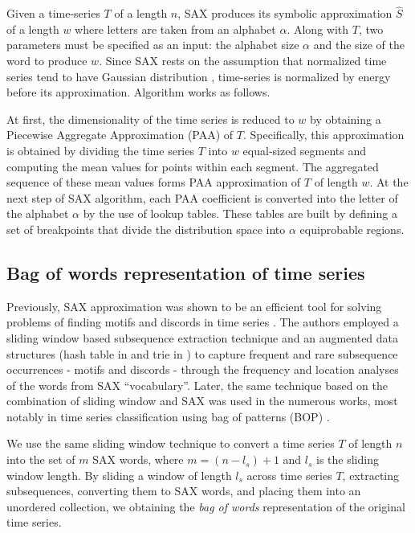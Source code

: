 \documentclass{llncs}
\begin{document}
Given a time-series $T$ of a length $n$, SAX produces its symbolic approximation $\hat{S}$ of 
a length $w$ where letters are taken from an alphabet $\alpha$. 
Along with $T$, two parameters must be specified as an input: the alphabet size $\alpha$ and the 
size of the word to produce $w$. Since SAX rests on the assumption that normalized time series 
tend to have Gaussian distribution \cite{larsen_marx}, time-series is normalized by energy 
\cite{goldin_kanellakis} before its approximation. Algorithm works as follows. 

At first, the dimensionality of the time series is reduced to $w$ by obtaining a 
Piecewise Aggregate Approximation (PAA) of $T$. Specifically, this approximation is 
obtained by dividing the time series $T$ into $w$ equal-sized segments and computing the 
mean values for points within each segment. The aggregated sequence of these mean 
values forms PAA approximation of $T$ of length $w$. At the next step of SAX algorithm, 
each PAA coefficient is converted into the letter of the alphabet $\alpha$ by the use of 
lookup tables. These tables are built by defining a set of breakpoints that divide the 
distribution space into $\alpha$ equiprobable regions.

\subsection{Bag of words representation of time series} \label{bow_representation}
Previously, SAX approximation was shown to be an efficient tool for solving problems 
of finding motifs and discords in time series \cite{motifs} \cite{hot_sax}. 
The authors employed a sliding window based subsequence extraction technique 
and an augmented data structures (hash table in \cite{motifs} and trie in \cite{hot_sax}) 
to capture frequent and rare subsequence occurrences - motifs and discords - 
through the frequency and location analyses of the words from SAX ``vocabulary''. 
Later, the same technique based on the combination of sliding window and SAX
was used in the numerous works, most notably in time series classification using 
bag of patterns (BOP) \cite{bag_patterns}. 

We use the same sliding window technique to convert a time series $T$ of 
length $n$ into the set of $m$ SAX words, where $m=(n-l_{s})+1$ and 
$l_{s}$ is the sliding window length. 
By sliding a window of length $l_{s}$ across time series $T$, extracting 
subsequences, converting them to SAX words, and placing them into an unordered 
collection, we obtaining the \textit{bag of words} representation of the 
original time series.
\end{document}

